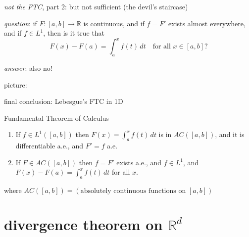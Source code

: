 \documentclass[10pt,
               svgnames,
               hyperref={colorlinks,
                         citecolor=DeepPink4,
                         linkcolor=FireBrick,
                         urlcolor=blue},
               usepdftitle=false]{beamer}
\newcommand{\RR}{\mathbb{R}}
\begin{document}
\begin{frame}{\emph{not the FTC}, part 2: but not sufficient (the devil's staircase)}

\medskip \noindent \emph{question}: if $F:[a,b]\to\RR$ is continuous, and if $f=F'$ exists almost everywhere, and if $f\in L^1$, then is it true that
    $$F(x) -F(a)= \int_a^x f(t)\,dt \quad \text{for all } x\in [a,b]?$$

\medskip \noindent \emph{answer}: also \alert{no}!

\bigskip
\noindent picture:

\vspace{50mm}
\end{frame}


\begin{frame}{final conclusion: Lebesgue's FTC in 1D}

\begin{block}{Fundamental Theorem of Calculus}
\begin{enumerate}
\item If $f \in L^1([a,b])$ then $F(x) = \int_a^x f(t)\,dt$ is in $AC([a,b])$, and it is differentiable a.e., and $F'=f$ a.e.
\item If $F \in AC([a,b])$ then $f=F'$ exists a.e., and $f\in L^1$, and $F(x)-F(a) = \int_a^x f(t)\,dt$ for all $x$.
\end{enumerate}
\end{block}

\vspace{10mm}
where $AC([a,b])=(\text{absolutely continuous functions on } [a,b])$
\end{frame}


\AtBeginSection[] {
    \begin{frame}{Outline}
    \setbeamertemplate{section in toc}[sections numbered]
    \tableofcontents[currentsection]%
    \end{frame}
}


\section{divergence theorem on $\RR^d$}
\end{document}

